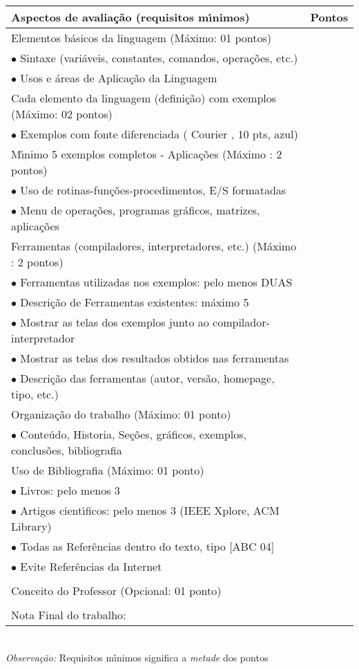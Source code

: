 \begin{tabular}{|p{12cm}|c|}
  \hline
  \textbf{Aspectos de avalia\c{c}\~{a}o (requisitos m\'{\i}nimos)} & \textbf{Pontos} \\
  \hline
  Elementos b\'{a}sicos da linguagem (M\'{a}ximo: 01 pontos) &  \\
  $\bullet$ Sintaxe (vari\'{a}veis, constantes, comandos, opera\c{c}\~{o}es, etc.) &  \\
  $\bullet$ Usos e \'{a}reas de Aplica\c{c}\~{a}o da Linguagem &  \\
  \hline
  Cada elemento da linguagem (defini\c{c}\~{a}o) com exemplos (M\'{a}ximo: 02 pontos) &  \\
  $\bullet$ Exemplos com fonte diferenciada ( Courier , 10 pts, azul) & \\
  \hline
  M\'{\i}nimo 5 exemplos completos - Aplica\c{c}\~{o}es (M\'{a}ximo : 2 pontos) &  \\
  $\bullet$ Uso de rotinas-fun\c{c}\~{o}es-procedimentos, E/S formatadas &  \\
  $\bullet$ Menu de opera\c{c}\~{o}es, programas gr\'{a}ficos, matrizes, aplica\c{c}\~{o}es &  \\
  \hline
  Ferramentas (compiladores, interpretadores, etc.) (M\'{a}ximo : 2 pontos) &  \\
  $\bullet$ Ferramentas utilizadas nos exemplos: pelo menos DUAS&  \\
  $\bullet$ Descri\c{c}\~{a}o de Ferramentas existentes:  m\'{a}ximo 5&  \\
  $\bullet$ Mostrar as telas dos exemplos junto ao compilador-interpretador&  \\
  $\bullet$  Mostrar as telas dos resultados obtidos nas ferramentas &  \\
  $\bullet$ Descri\c{c}\~{a}o das ferramentas (autor, vers\~{a}o, homepage, tipo, etc.) &  \\
  \hline
  Organiza\c{c}\~{a}o do trabalho (M\'{a}ximo: 01 ponto) &  \\
  $\bullet$ Conte\'{u}do, Historia, Se\c{c}\~{o}es, gr\'{a}ficos, exemplos, conclus\~{o}es, bibliografia &  \\
  \hline
   Uso de Bibliografia (M\'{a}ximo: 01 ponto)&  \\
   $\bullet$ Livros: pelo menos 3&  \\
   $\bullet$ Artigos cient\'{\i}ficos: pelo menos 3 (IEEE Xplore, ACM Library)&  \\
   $\bullet$ Todas as Refer\^{e}ncias dentro do texto, tipo [ABC 04] & \\
   $\bullet$ Evite Refer\^{e}ncias da Internet & \\
   \hline
     &  \\
  Conceito do Professor (Opcional: 01 ponto) & \\
  \hline
   & \\
  \hfill Nota Final do trabalho: & \\
  \hline
\end{tabular}\\
\textit{Observa\c{c}\~{a}o:} Requisitos m\'{\i}nimos significa a \textit{metade} dos pontos
